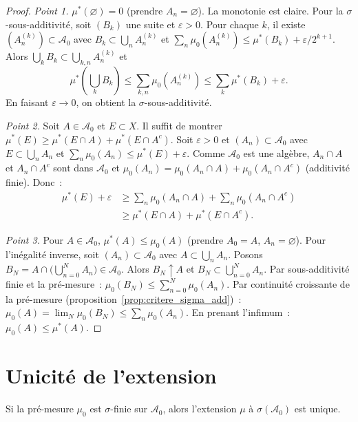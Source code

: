 \begin{proof}
\emph{Point 1.} $\mu^*(\varnothing) = 0$ (prendre $A_n = \varnothing$). La
monotonie est claire. Pour la $\sigma$-sous-additivit\'e, soit $(B_k)$ une suite et
$\varepsilon > 0$. Pour chaque $k$, il existe $(A_n^{(k)}) \subset \mathcal{A}_0$
avec $B_k \subset \bigcup_n A_n^{(k)}$ et $\sum_n \mu_0(A_n^{(k)}) \leq
\mu^*(B_k) + \varepsilon/2^{k+1}$. Alors $\bigcup_k B_k \subset
\bigcup_{k,n} A_n^{(k)}$ et
\[
\mu^*\!\left(\bigcup_k B_k\right) \leq \sum_{k,n} \mu_0(A_n^{(k)}) \leq
\sum_k \mu^*(B_k) + \varepsilon.
\]
En faisant $\varepsilon \to 0$, on obtient la $\sigma$-sous-additivit\'e.

\emph{Point 2.} Soit $A \in \mathcal{A}_0$ et $E \subset X$. Il suffit de montrer
$\mu^*(E) \geq \mu^*(E \cap A) + \mu^*(E \cap A^c)$. Soit $\varepsilon > 0$ et
$(A_n) \subset \mathcal{A}_0$ avec $E \subset \bigcup_n A_n$ et $\sum_n \mu_0(A_n)
\leq \mu^*(E) + \varepsilon$. Comme $\mathcal{A}_0$ est une alg\`ebre,
$A_n \cap A$ et $A_n \cap A^c$ sont dans $\mathcal{A}_0$ et
$\mu_0(A_n) = \mu_0(A_n \cap A) + \mu_0(A_n \cap A^c)$ (additivit\'e finie). Donc~:
\begin{align*}
\mu^*(E) + \varepsilon &\geq \sum_n \mu_0(A_n \cap A) + \sum_n \mu_0(A_n \cap A^c)
\\ &\geq \mu^*(E \cap A) + \mu^*(E \cap A^c).
\end{align*}

\emph{Point 3.} Pour $A \in \mathcal{A}_0$, $\mu^*(A) \leq \mu_0(A)$ (prendre
$A_0 = A$, $A_n = \varnothing$). Pour l'in\'egalit\'e inverse, soit $(A_n) \subset
\mathcal{A}_0$ avec $A \subset \bigcup_n A_n$. Posons $B_N = A \cap
\bigl(\bigcup_{n=0}^N A_n\bigr) \in \mathcal{A}_0$. Alors $B_N \uparrow A$ et
$B_N \subset \bigcup_{n=0}^N A_n$. Par sous-additivit\'e finie et la pr\'e-mesure~:
$\mu_0(B_N) \leq \sum_{n=0}^N \mu_0(A_n)$. Par continuit\'e croissante de la
pr\'e-mesure (proposition~\ref{prop:critere_sigma_add})~:
$\mu_0(A) = \lim_N \mu_0(B_N) \leq \sum_n \mu_0(A_n)$. En prenant l'infimum~:
$\mu_0(A) \leq \mu^*(A)$.
\end{proof}

\section{Unicit\'e de l'extension}

\begin{theoreme}[Unicit\'e]
\label{thm:unicite_extension}
Si la pr\'e-mesure $\mu_0$ est $\sigma$-finie sur $\mathcal{A}_0$, alors l'extension
$\mu$ \`a $\sigma(\mathcal{A}_0)$ est unique.
\end{theoreme}

